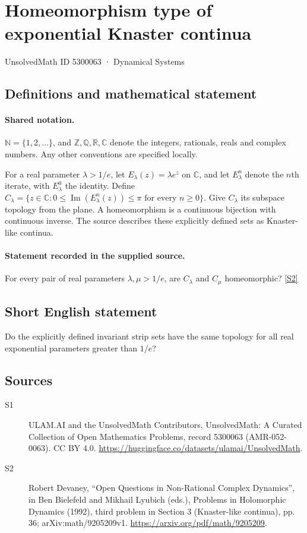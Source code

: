 \documentclass[11pt]{article}
\newcommand{\sref}[2]{\hyperlink{source:#1:#2}{[S#2]}}
\begin{document}
\setcounter{section}{5300062}
\section{Homeomorphism type of exponential Knaster continua}\label{5300063}
{\small\sffamily UnsolvedMath ID 5300063 · Dynamical Systems}
\subsection{Definitions and mathematical statement}

\paragraph{Shared notation.}$\mathbb N=\{1,2,\ldots\}$, and $\mathbb Z,\mathbb Q,\mathbb R,\mathbb C$ denote the integers, rationals, reals and complex numbers. Any other conventions are specified locally.


For a real parameter $\lambda>1/e$, let $E_\lambda(z)=\lambda e^z$ on $\mathbb C$, and let $E_\lambda^n$ denote the $n$th iterate, with $E_\lambda^0$ the identity. Define $C_\lambda=\{z\in\mathbb C:0\leq\operatorname{Im}(E_\lambda^n(z))\leq\pi\text{ for every }n\geq0\}$. Give $C_\lambda$ its subspace topology from the plane. A homeomorphism is a continuous bijection with continuous inverse. The source describes these explicitly defined sets as Knaster-like continua.
\paragraph{Statement recorded in the supplied source.}
For every pair of real parameters $\lambda,\mu>1/e$, are $C_\lambda$ and $C_\mu$ homeomorphic? \sref{5300063}{2}
\subsection{Short English statement}
Do the explicitly defined invariant strip sets have the same topology for all real exponential parameters greater than $1/e$?
\subsection{Sources}
\begin{description}
\item[\hypertarget{source:5300063:1}{S1}] ULAM.AI and the UnsolvedMath Contributors, UnsolvedMath: A Curated Collection of Open Mathematics Problems, record 5300063 (AMR-052-0063). CC BY 4.0. \url{https://huggingface.co/datasets/ulamai/UnsolvedMath}.
\item[\hypertarget{source:5300063:2}{S2}] Robert Devaney, ``Open Questions in Non-Rational Complex Dynamics'', in Ben Bielefeld and Mikhail Lyubich (eds.), Problems in Holomorphic Dynamics (1992), third problem in Section 3 (Knaster-like continua), pp. 36; arXiv:math/9205209v1. \url{https://arxiv.org/pdf/math/9205209}.
\end{description}
\label{end:5300063}
\end{document}
